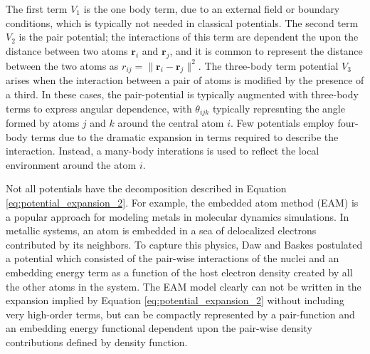 The first term $V_1$ is the one body term, due to an external field or boundary conditions, which is typically not needed in classical potentials.  The second term $V_2$ is the pair potential; the interactions of this term are dependent the upon the distance between two atoms $\bm{r}_i$ and $\bm{r}_j$, and it is common to represent the distance between the two atoms as $r_{ij}=\lVert \bm{r}_i - \bm{r}_j \rVert^2$.  The three-body term potential $V_3$ arises when the interaction between a pair of atoms is modified by the presence of a third.  In these cases, the pair-potential is typically augmented with three-body terms to express angular dependence, with $\theta_{ijk}$ typically represnting the angle formed by atoms $j$ and $k$ around the central atom $i$\cite{stillinger1985_sw}.  Few potentials employ four-body terms due to the dramatic expansion in terms required to describe the interaction.  Instead, a many-body interations is used to reflect the local environment around the atom $i$.

Not all potentials have the decomposition described in Equation \ref{eq:potential_expansion_2}.  For example, the embedded atom method (EAM)\cite{daw1984_eam} is a popular approach for modeling metals in molecular dynamics simulations.  In metallic systems, an atom is embedded in a sea of delocalized electrons contributed by its neighbors.  To capture this physics, Daw and Baskes postulated a potential which consisted of the pair-wise interactions of the nuclei and an embedding energy term as a function of the host electron density created by all the other atoms in the system.  The EAM model clearly can not be written in the expansion implied by Equation \ref{eq:potential_expansion_2} without including very high-order terms, but can be compactly represented by a pair-function and an embedding energy functional dependent upon the pair-wise density contributions defined by density function.

